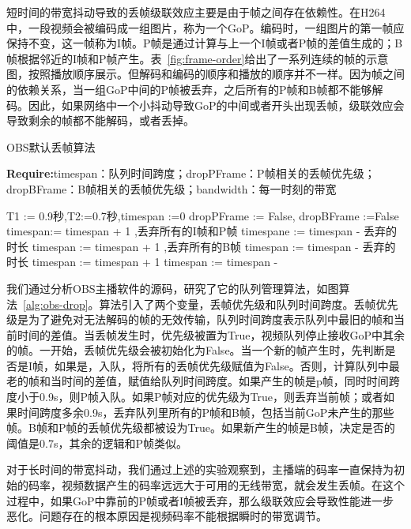 短时间的带宽抖动导致的丢帧级联效应主要是由于帧之间存在依赖性。在H264中，一段视频会被编码成一组图片，称为一个GoP。编码时，一组图片的第一帧应保持不变，这一帧称为I帧。P帧是通过计算与上一个I帧或者P帧的差值生成的；B帧根据邻近的I帧和P帧产生。表~\ref{fig:frame-order}给出了一系列连续的帧的示意图，按照播放顺序展示。但解码和编码的顺序和播放的顺序并不一样。因为帧之间的依赖关系，当一组GoP中间的P帧被丢弃，之后所有的P帧和B帧都不能够解码。因此，如果网络中一个小抖动导致GoP的中间或者开头出现丢帧，级联效应会导致剩余的帧都不能解码，或者丢掉。

\begin{algorithm}[htb]
\caption{OBS默认丢帧算法}
\label{alg:obs-drop}
{\bf Require:}timespan：队列时间跨度；dropPFrame：P帧相关的丢帧优先级；dropBFrame：B帧相关的丢帧优先级；bandwidth：每一时刻的带宽
\begin{algorithmic}[1]
\State T1 := 0.9秒,T2:=0.7秒,timespan :=0
\State dropPFrame := False, dropBFrame :=False
\State {}
\State timespan:= timespan + 1
\EndIf
{}
\State {},丢弃所有的I帧和P帧
\State timespane := timespan - 丢弃的时长
\Else
\State {}
\State timespan := timespan + 1
\EndIf
\EndIf
{}
\State {},丢弃所有的B帧
\State timespan := timespan - 丢弃的时长
\Else
\State {}
\State timespan := timespan + 1
\EndIf
\EndIf
\State timespan := timespan - 
\end{algorithmic}
\end{algorithm}


我们通过分析OBS主播软件的源码，研究了它的队列管理算法，如图算法~\ref{alg:obs-drop}。算法引入了两个变量，丢帧优先级和队列时间跨度。丢帧优先级是为了避免对无法解码的帧的无效传输，队列时间跨度表示队列中最旧的帧和当前时间的差值。当丢帧发生时，优先级被置为True，视频队列停止接收GoP中其余的帧。一开始，丢帧优先级会被初始化为False。当一个新的帧产生时，先判断是否是I帧，如果是，入队，将所有的丢帧优先级赋值为False。否则，计算队列中最老的帧和当时间的差值，赋值给队列时间跨度。如果产生的帧是p帧，同时时间跨度小于0.9s，则P帧入队。如果P帧对应的优先级为True，则丢弃当前帧；或者如果时间跨度多余0.9s，丢弃队列里所有的P帧和B帧，包括当前GoP未产生的那些帧。B帧和P帧的丢帧优先级都被设为True。如果新产生的帧是B帧，决定是否的阈值是0.7s，其余的逻辑和P帧类似。

对于长时间的带宽抖动，我们通过上述的实验观察到，主播端的码率一直保持为初始的码率，视频数据产生的码率远远大于可用的无线带宽，就会发生丢帧。在这个过程中，如果GoP中靠前的P帧或者I帧被丢弃，那么级联效应会导致性能进一步恶化。问题存在的根本原因是视频码率不能根据瞬时的带宽调节。

